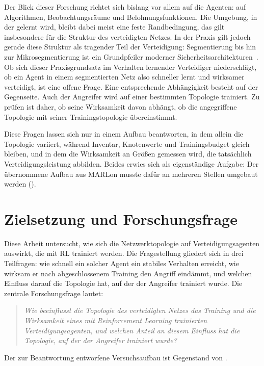 Der Blick dieser Forschung richtet sich bislang vor allem auf die Agenten:
auf Algorithmen, Beobachtungsräume und Belohnungsfunktionen. Die Umgebung, in der gelernt wird, bleibt dabei meist eine feste
Randbedingung, das gilt insbesondere für die Struktur des
verteidigten Netzes. In der Praxis gilt
jedoch gerade diese Struktur als tragender Teil der Verteidigung:
Segmentierung bis hin zur Mikrosegmentierung ist ein Grundpfeiler
moderner Sicherheitsarchitekturen~\cite{nist800207}. Ob sich dieser Praxisgrundsatz im Verhalten lernender Verteidiger
niederschlägt, ob ein Agent in einem segmentierten Netz also schneller
lernt und wirksamer verteidigt, ist eine offene Frage. Eine entsprechende Abhängigkeit besteht auf der Gegenseite. Auch der
Angreifer wird auf einer bestimmten Topologie trainiert. Zu prüfen ist daher,
ob seine Wirksamkeit davon abhängt, ob die angegriffene Topologie mit seiner
Trainingstopologie übereinstimmt.

Diese Fragen lassen sich nur in einem Aufbau beantworten, in dem allein
die Topologie variiert, während Inventar, Knotenwerte und
Trainingsbudget gleich bleiben, und in dem die Wirksamkeit an Größen
gemessen wird, die tatsächlich Verteidigungsleistung abbilden. Beides
erwies sich als eigenständige Aufgabe: Der übernommene Aufbau aus MARLon
musste dafür an mehreren Stellen umgebaut werden
().

\section{Zielsetzung und Forschungsfrage}
\label{sec:ziel}

Diese Arbeit untersucht, wie sich die Netzwerktopologie auf
Verteidigungsagenten auswirkt, die mit \ac{RL} trainiert werden. Die Fragestellung gliedert sich in drei Teilfragen: wie schnell ein solcher Agent ein stabiles Verhalten
erreicht, wie wirksam er nach abgeschlossenem Training den Angriff
eindämmt, und welchen Einfluss darauf die Topologie hat, auf der der
Angreifer trainiert wurde. Die zentrale Forschungsfrage lautet:
\begin{quote}
  \textit{Wie beeinflusst die Topologie des verteidigten Netzes das
  Training und die Wirksamkeit eines mit Reinforcement Learning
  trainierten Verteidigungsagenten, und welchen Anteil an diesem Einfluss
  hat die Topologie, auf der der Angreifer trainiert wurde?}
\end{quote}
Der zur Beantwortung entworfene Versuchsaufbau ist Gegenstand von
.

